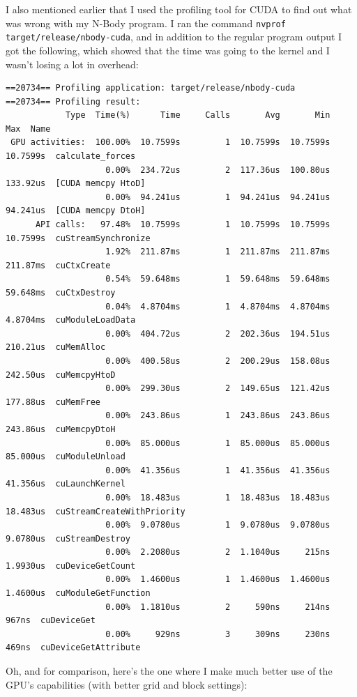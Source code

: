 \documentclass[a4paper]{report}
\begin{document}
I also mentioned earlier that I used the profiling tool for CUDA to find out what was wrong with my N-Body program. I ran the command \texttt{nvprof target/release/nbody-cuda}, and in addition to the regular program output I got the following, which showed that the time was going to the kernel and I wasn't losing a lot in overhead:

{\scriptsize
\begin{verbatim}
==20734== Profiling application: target/release/nbody-cuda
==20734== Profiling result:
            Type  Time(%)      Time     Calls       Avg       Min       Max  Name
 GPU activities:  100.00%  10.7599s         1  10.7599s  10.7599s  10.7599s  calculate_forces
                    0.00%  234.72us         2  117.36us  100.80us  133.92us  [CUDA memcpy HtoD]
                    0.00%  94.241us         1  94.241us  94.241us  94.241us  [CUDA memcpy DtoH]
      API calls:   97.48%  10.7599s         1  10.7599s  10.7599s  10.7599s  cuStreamSynchronize
                    1.92%  211.87ms         1  211.87ms  211.87ms  211.87ms  cuCtxCreate
                    0.54%  59.648ms         1  59.648ms  59.648ms  59.648ms  cuCtxDestroy
                    0.04%  4.8704ms         1  4.8704ms  4.8704ms  4.8704ms  cuModuleLoadData
                    0.00%  404.72us         2  202.36us  194.51us  210.21us  cuMemAlloc
                    0.00%  400.58us         2  200.29us  158.08us  242.50us  cuMemcpyHtoD
                    0.00%  299.30us         2  149.65us  121.42us  177.88us  cuMemFree
                    0.00%  243.86us         1  243.86us  243.86us  243.86us  cuMemcpyDtoH
                    0.00%  85.000us         1  85.000us  85.000us  85.000us  cuModuleUnload
                    0.00%  41.356us         1  41.356us  41.356us  41.356us  cuLaunchKernel
                    0.00%  18.483us         1  18.483us  18.483us  18.483us  cuStreamCreateWithPriority
                    0.00%  9.0780us         1  9.0780us  9.0780us  9.0780us  cuStreamDestroy
                    0.00%  2.2080us         2  1.1040us     215ns  1.9930us  cuDeviceGetCount
                    0.00%  1.4600us         1  1.4600us  1.4600us  1.4600us  cuModuleGetFunction
                    0.00%  1.1810us         2     590ns     214ns     967ns  cuDeviceGet
                    0.00%     929ns         3     309ns     230ns     469ns  cuDeviceGetAttribute
\end{verbatim}
}

Oh, and for comparison, here's the one where I make much better use of the GPU's capabilities (with better grid and block settings):
\end{document}
